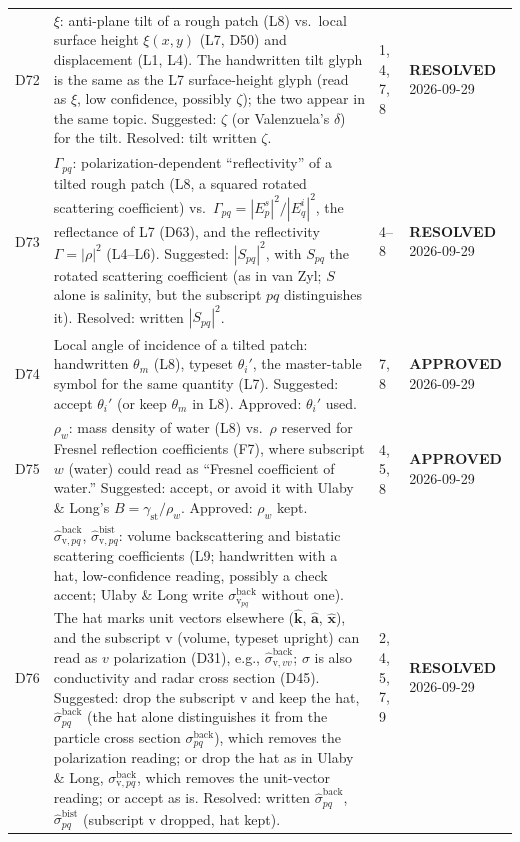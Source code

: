 \documentclass[11pt, oneside]{article}
\newcommand{\approved}{\textbf{APPROVED}}
\newcommand{\resolved}{\textbf{RESOLVED}}
\begin{document}
\begin{longtable}{l >{\raggedright\arraybackslash}p{} l l}
D72 & $\xi$: anti-plane tilt of a rough patch (L8) vs.\ local surface height $\xi(x,y)$ (L7, D50) and displacement (L1, L4). The handwritten tilt glyph is the same as the L7 surface-height glyph (read as $\xi$, low confidence, possibly $\zeta$); the two appear in the same topic. Suggested: $\zeta$ (or Valenzuela's $\delta$) for the tilt. Resolved: tilt written $\zeta$. & 1, 4, 7, 8 & \resolved{} 2026-09-29 \\
D73 & $\Gamma_{pq}$: polarization-dependent ``reflectivity'' of a tilted rough patch (L8, a squared rotated scattering coefficient) vs.\ $\Gamma_{pq} = |E_p^s|^2/|E_q^i|^2$, the reflectance of L7 (D63), and the reflectivity $\Gamma = |\rho|^2$ (L4--L6). Suggested: $|S_{pq}|^2$, with $S_{pq}$ the rotated scattering coefficient (as in van Zyl; $S$ alone is salinity, but the subscript $pq$ distinguishes it). Resolved: written $|S_{pq}|^2$. & 4--8 & \resolved{} 2026-09-29 \\
D74 & Local angle of incidence of a tilted patch: handwritten $\theta_m$ (L8), typeset $\theta_i'$, the master-table symbol for the same quantity (L7). Suggested: accept $\theta_i'$ (or keep $\theta_m$ in L8). Approved: $\theta_i'$ used. & 7, 8 & \approved{} 2026-09-29 \\
D75 & $\rho_w$: mass density of water (L8) vs.\ $\rho$ reserved for Fresnel reflection coefficients (F7), where subscript $w$ (water) could read as ``Fresnel coefficient of water.'' Suggested: accept, or avoid it with Ulaby \& Long's $B = \gamma_\mathrm{st}/\rho_w$. Approved: $\rho_w$ kept. & 4, 5, 8 & \approved{} 2026-09-29 \\
D76 & $\hat{\sigma}^\mathrm{back}_{\mathrm{v},pq}$, $\hat{\sigma}^\mathrm{bist}_{\mathrm{v},pq}$: volume backscattering and bistatic scattering coefficients (L9; handwritten with a hat, low-confidence reading, possibly a check accent; Ulaby \& Long write $\sigma^\mathrm{back}_{\mathrm{v}_{pq}}$ without one). The hat marks unit vectors elsewhere ($\hat{\mathbf{k}}$, $\hat{\mathbf{a}}$, $\hat{\mathbf{x}}$), and the subscript v (volume, typeset upright) can read as $v$ polarization (D31), e.g., $\hat{\sigma}^\mathrm{back}_{\mathrm{v},vv}$; $\sigma$ is also conductivity and radar cross section (D45). Suggested: drop the subscript v and keep the hat, $\hat{\sigma}^\mathrm{back}_{pq}$ (the hat alone distinguishes it from the particle cross section $\sigma^\mathrm{back}_{pq}$), which removes the polarization reading; or drop the hat as in Ulaby \& Long, $\sigma^\mathrm{back}_{\mathrm{v},pq}$, which removes the unit-vector reading; or accept as is. Resolved: written $\hat{\sigma}^\mathrm{back}_{pq}$, $\hat{\sigma}^\mathrm{bist}_{pq}$ (subscript v dropped, hat kept). & 2, 4, 5, 7, 9 & \resolved{} 2026-09-29 \\

\end{longtable}
\end{document}
